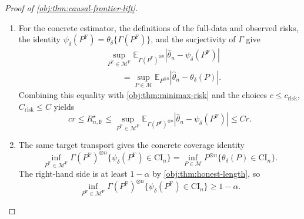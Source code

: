 \documentclass[11pt]{article}
\begin{document}
\begin{proof}[Proof of \cref{obj:thm:causal-frontier-lift}]
\begin{enumerate}
\item For the concrete estimator, the definitions of the full-data and observed
risks, the identity
\(\psi_\delta(P^{\mathrm F})=\theta_\delta\{\Gamma(P^{\mathrm F})\}\), and the
surjectivity of \(\Gamma\) give
\[
\begin{aligned}
&\sup_{P^{\mathrm F}\in\mathcal M^{\mathrm F}}
\mathbb E_{\Gamma(P^{\mathrm F})^{\otimes n}}
\left|\widehat\theta_n-\psi_\delta(P^{\mathrm F})\right|  \\
&\qquad =
\sup_{P\in\mathcal M}
\mathbb E_{P^{\otimes n}}
\left|\widehat\theta_n-\theta_\delta(P)\right|.
\end{aligned}
\]
Combining this equality with \cref{obj:thm:minimax-risk} and the choices
\(c\le c_{\mathrm{risk}}\), \(C_{\mathrm{risk}}\le C\) yields
\[
c r
\le
R_{n,\mathrm F}^\star
\le
\sup_{P^{\mathrm F}\in\mathcal M^{\mathrm F}}
\mathbb E_{\Gamma(P^{\mathrm F})^{\otimes n}}
\left|\widehat\theta_n-\psi_\delta(P^{\mathrm F})\right|
\le
C r .
\]

\item The same target transport gives the concrete coverage identity
\[
\inf_{P^{\mathrm F}\in\mathcal M^{\mathrm F}}
\Gamma(P^{\mathrm F})^{\otimes n}
\{\psi_\delta(P^{\mathrm F})\in \mathrm{CI}_n\}
=
\inf_{P\in\mathcal M}
P^{\otimes n}\{\theta_\delta(P)\in \mathrm{CI}_n\}.
\]
The right-hand side is at least \(1-\alpha\) by
\cref{obj:thm:honest-length}, so
\[
\inf_{P^{\mathrm F}\in\mathcal M^{\mathrm F}}
\Gamma(P^{\mathrm F})^{\otimes n}
\{\psi_\delta(P^{\mathrm F})\in \mathrm{CI}_n\}
\ge 1-\alpha .
\]


\end{enumerate}
\end{proof}
\end{document}
